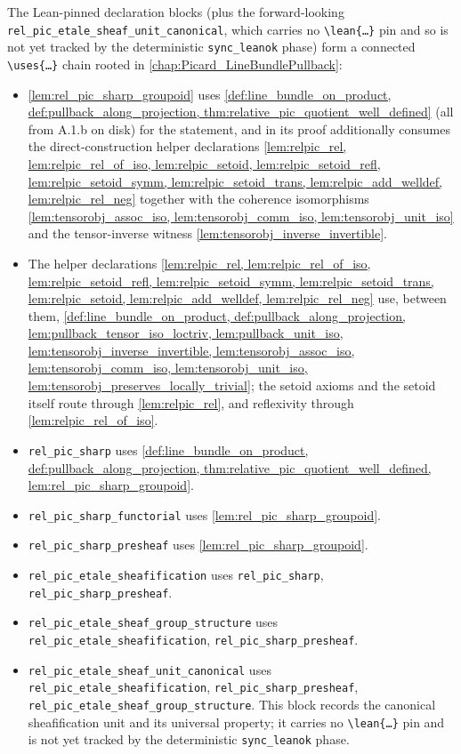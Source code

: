 The Lean-pinned declaration blocks (plus the forward-looking
\texttt{rel\_pic\_etale\_sheaf\_unit\_canonical}, which carries no
\texttt{\textbackslash lean\{\dots\}} pin and so is not yet tracked by
the deterministic \texttt{sync\_leanok} phase) form a connected
\texttt{\textbackslash uses\{\dots\}} chain rooted in
\cref{chap:Picard_LineBundlePullback}:
\begin{itemize}
  \item \cref{lem:rel_pic_sharp_groupoid} uses
    \cref{def:line_bundle_on_product, def:pullback_along_projection,
    thm:relative_pic_quotient_well_defined} (all from A.1.b on disk) for the
    statement, and in its proof additionally consumes the direct-construction
    helper declarations \cref{lem:relpic_rel, lem:relpic_rel_of_iso,
    lem:relpic_setoid, lem:relpic_setoid_refl, lem:relpic_setoid_symm,
    lem:relpic_setoid_trans, lem:relpic_add_welldef, lem:relpic_rel_neg}
    together with the coherence isomorphisms
    \cref{lem:tensorobj_assoc_iso, lem:tensorobj_comm_iso,
    lem:tensorobj_unit_iso} and the tensor-inverse witness
    \cref{lem:tensorobj_inverse_invertible}.
  \item The helper declarations
    \cref{lem:relpic_rel, lem:relpic_rel_of_iso, lem:relpic_setoid_refl,
    lem:relpic_setoid_symm, lem:relpic_setoid_trans, lem:relpic_setoid,
    lem:relpic_add_welldef, lem:relpic_rel_neg} use, between them,
    \cref{def:line_bundle_on_product, def:pullback_along_projection,
    lem:pullback_tensor_iso_loctriv,
    lem:pullback_unit_iso, lem:tensorobj_inverse_invertible,
    lem:tensorobj_assoc_iso, lem:tensorobj_comm_iso, lem:tensorobj_unit_iso,
    lem:tensorobj_preserves_locally_trivial}; the setoid axioms and the setoid
    itself route through \cref{lem:relpic_rel}, and reflexivity through
    \cref{lem:relpic_rel_of_iso}.
  \item \texttt{rel\_pic\_sharp} uses
    \cref{def:line_bundle_on_product, def:pullback_along_projection,
    thm:relative_pic_quotient_well_defined, lem:rel_pic_sharp_groupoid}.
  \item \texttt{rel\_pic\_sharp\_functorial} uses
    \cref{lem:rel_pic_sharp_groupoid}.
  \item \texttt{rel\_pic\_sharp\_presheaf} uses
    \cref{lem:rel_pic_sharp_groupoid}.
  \item \texttt{rel\_pic\_etale\_sheafification} uses
    \texttt{rel\_pic\_sharp}, \texttt{rel\_pic\_sharp\_presheaf}.
  \item \texttt{rel\_pic\_etale\_sheaf\_group\_structure} uses
    \texttt{rel\_pic\_etale\_sheafification}, \texttt{rel\_pic\_sharp\_presheaf}.
  \item \texttt{rel\_pic\_etale\_sheaf\_unit\_canonical} uses
    \texttt{rel\_pic\_etale\_sheafification}, \texttt{rel\_pic\_sharp\_presheaf}, \texttt{rel\_pic\_etale\_sheaf\_group\_structure}. This block records the
    canonical sheafification unit and its universal property; it carries
    no \texttt{\textbackslash lean\{\dots\}} pin and is not yet tracked
    by the deterministic \texttt{sync\_leanok} phase.
\end{itemize}
